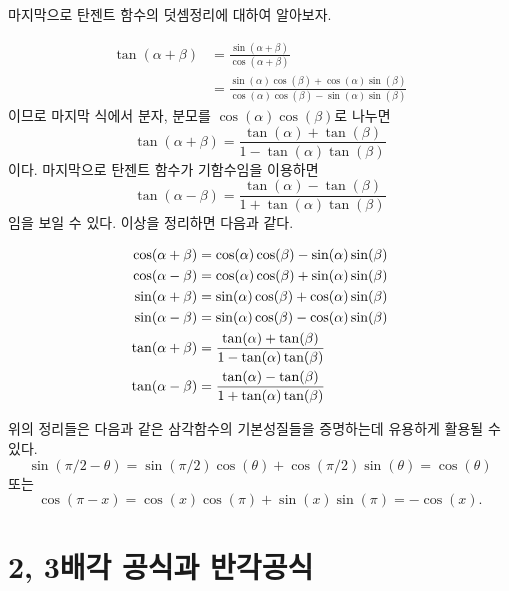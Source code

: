 \documentclass[11pt, a4paper]{book}
\begin{document}
  마지막으로 탄젠트 함수의 덧셈정리에 대하여 알아보자.
  
\begin{align*}
  	\tan\left(\alpha+\beta\right) &= \frac{\sin\left(\alpha+\beta\right)}{\cos(\alpha+\beta)}\\
  	&=\frac{\sin(\alpha)\cos(\beta)+\cos(\alpha)\sin(\beta)}{\cos(\alpha)\cos(\beta)-\sin(\alpha)\sin(\beta)}
\end{align*}
이므로 마지막 식에서 분자, 분모를 $\cos(\alpha)\cos(\beta)$로 나누면
\[
\tan(\alpha+\beta) =\frac{\tan(\alpha)+\tan(\beta)}{1-\tan(\alpha)\tan(\beta)}
\]
이다. 
  마지막으로 탄젠트 함수가 기함수임을 이용하면
  \[
  \tan\left(\alpha -\beta \right) =\frac{\tan(\alpha)-\tan(\beta)}{1+\tan(\alpha)\tan(\beta)}
  \]
임을 보일 수 있다.
  이상을 정리하면 다음과 같다.
  
  \begin{theorem}[삼각함수의 덧셈 정리]\vspace{-2em}
  \begin{align*}\vspace{-2em}
	\cos(\alpha+\beta) &= \cos(\alpha)\cos(\beta) - \sin(\alpha)\sin(\beta)\\
	\cos(\alpha-\beta) &= \cos(\alpha)\cos(\beta) + \sin(\alpha)\sin(\beta)\\
	\sin(\alpha+\beta) &= \sin(\alpha)\cos(\beta) + \cos(\alpha)\sin(\beta)\\
	\sin(\alpha-\beta) &= \sin(\alpha)\cos(\beta) - \cos(\alpha)\sin(\beta)\\
	\tan(\alpha+\beta) &=\frac{\tan(\alpha)+\tan(\beta)}{1-\tan(\alpha)\tan(\beta)}\\
	\tan(\alpha-\beta) &=\frac{\tan(\alpha)-\tan(\beta)}{1+\tan(\alpha)\tan(\beta)}
  \end{align*}
  \end{theorem}  

위의 정리들은 다음과 같은 삼각함수의 기본성질들을 증명하는데 유용하게 활용될 수 있다.
\[\sin(\pi/2 - \theta) = \sin(\pi/2)\cos(\theta) + \cos(\pi/2)\sin(\theta) =\cos(\theta)
\] 또는
\[\cos(\pi-x) = \cos(x)\cos(\pi) + \sin(x)\sin(\pi) =-\cos(x).
\]

\section{2, 3배각 공식과 반각공식}
\end{document}
